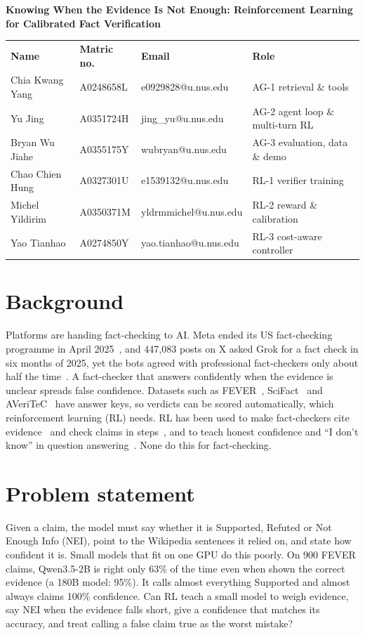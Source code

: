 \documentclass[10pt]{article}
\begin{document}
\begin{center}
  {\large\bfseries Knowing When the Evidence Is Not Enough:
  Reinforcement Learning for Calibrated Fact Verification\par}
  \vspace{4pt}
  \begin{tabular}{@{}llll@{}}
    \textbf{Name} & \textbf{Matric no.} & \textbf{Email} & \textbf{Role} \\
    Chia Kwang Yang & A0248658L & e0929828@u.nus.edu & AG-1 retrieval \& tools \\
    Yu Jing & A0351724H & jing\_yu@u.nus.edu & AG-2 agent loop \& multi-turn RL \\
    Bryan Wu Jiahe & A0355175Y & wubryan@u.nus.edu & AG-3 evaluation, data \& demo \\
    Chao Chien Hung & A0327301U & e1539132@u.nus.edu & RL-1 verifier training \\
    Michel Yildirim & A0350371M & yldrmmichel@u.nus.edu & RL-2 reward \& calibration \\
    Yao Tianhao & A0274850Y & yao.tianhao@u.nus.edu & RL-3 cost-aware controller \\
  \end{tabular}
\end{center}
\vspace{-8pt}

\section*{Background}
Platforms are handing fact-checking to AI. Meta ended its US fact-checking programme in April
2025~\cite{meta}, and 447{,}083 posts on X asked Grok for a fact check in six months of 2025, yet the bots
agreed with professional fact-checkers only about half the time~\cite{renault}. A fact-checker that answers
confidently when the evidence is unclear spreads false confidence. Datasets such as FEVER~\cite{fever},
SciFact~\cite{scifact} and AVeriTeC~\cite{averitec} have answer keys, so verdicts can be scored
automatically, which reinforcement learning (RL) needs. RL has been used to make fact-checkers
cite evidence~\cite{verir1} and check claims in steps~\cite{profact}, and to teach honest confidence and
``I don't know'' in question answering~\cite{rlcr,truthrl}. None do this for fact-checking.

\section*{Problem statement}
Given a claim, the model must say whether it is Supported, Refuted or Not Enough Info (NEI), point to the
Wikipedia sentences it relied on, and state how confident it is. Small models that fit on one GPU do this
poorly. On 900 FEVER claims, Qwen3.5-2B is right only 63\% of the time even when shown the correct evidence
(a 180B model: 95\%). It calls almost everything Supported and almost always claims 100\% confidence. Can
RL teach a small model to weigh evidence, say NEI when the evidence falls short, give a confidence that
matches its accuracy, and treat calling a false claim true as the worst mistake?
\end{document}
